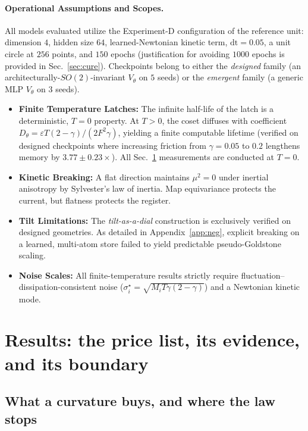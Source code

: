 \documentclass{article}
\begin{document}
\paragraph{Operational Assumptions and Scopes.} All models evaluated utilize the Experiment-D configuration of the reference unit: dimension $4$, hidden size $64$, learned-Newtonian kinetic term, $\mathrm{dt}=0.05$, a unit circle at $256$ points, and $150$ epochs (justification for avoiding $1000$ epochs is provided in Sec.~\ref{sec:cure}). Checkpoints belong to either the \emph{designed} family (an architecturally-$SO(2)$-invariant $V_\theta$ on $5$ seeds) or the \emph{emergent} family (a generic MLP $V_\theta$ on $3$ seeds).
\begin{itemize}
    \item \textbf{Finite Temperature Latches:} The infinite half-life of the latch is a deterministic, $T=0$ property. At $T>0$, the coset diffuses with coefficient $D_\theta=\varepsilon T(2-\gamma)/(2F^2\gamma)$, yielding a finite computable lifetime (verified on designed checkpoints where increasing friction from $\gamma=0.05$ to $0.2$ lengthens memory by $3.77\pm0.23\times$). All Sec.~\ref{sec:results} measurements are conducted at $T=0$.
    \item \textbf{Kinetic Breaking:} A flat direction maintains $\mu^2=0$ under inertial anisotropy by Sylvester's law of inertia. Map equivariance protects the current, but flatness protects the register.
    \item \textbf{Tilt Limitations:} The \emph{tilt-as-a-dial} construction is exclusively verified on designed geometries. As detailed in Appendix~\ref{app:neg}, explicit breaking on a learned, multi-atom store failed to yield predictable pseudo-Goldstone scaling.
    \item \textbf{Noise Scales:} All finite-temperature results strictly require fluctuation--dissipation-consistent noise ($\sigma^\star_i=\sqrt{M_iT\gamma(2-\gamma)}$) and a Newtonian kinetic mode.
\end{itemize}

\section{Results: the price list, its evidence, and its boundary}\label{sec:results}

\subsection{What a curvature buys, and where the law stops}\label{sec:pricelist}
\end{document}
